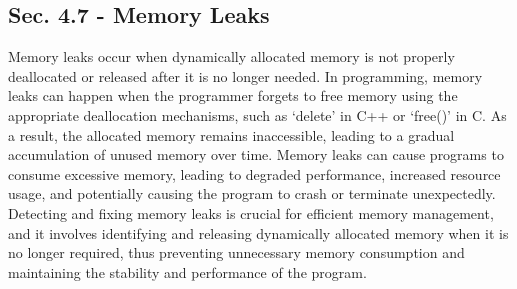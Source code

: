 \subsection*{Sec. 4.7 - Memory Leaks}

Memory leaks occur when dynamically allocated memory is not properly deallocated or released after it is no longer needed. In programming, memory leaks can happen when the programmer forgets to free memory using the appropriate deallocation mechanisms, such 
as `delete' in C++ or `free()' in C. As a result, the allocated memory remains inaccessible, leading to a gradual accumulation of unused memory over time. Memory leaks can cause programs to consume excessive memory, leading to degraded performance, increased 
resource usage, and potentially causing the program to crash or terminate unexpectedly. Detecting and fixing memory leaks is crucial for efficient memory management, and it involves identifying and releasing dynamically allocated memory when it is no longer 
required, thus preventing unnecessary memory consumption and maintaining the stability and performance of the program.

